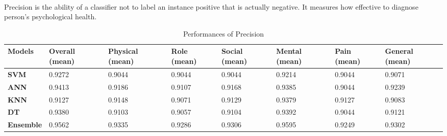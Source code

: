 \documentclass[runningheads]{llncs}
\begin{document}
\paragraph{}
Precision is the ability of a classifier not to label an instance positive that is actually negative. It measures how effective to diagnose person's psychological health.
\begin{table}[h]
\begin{tabular}{|C{2cm}|C{1.5cm}|C{1.5cm}|C{1.5cm}|C{1.5cm}|C{1.5cm}|C{1.5cm}|C{1.5cm}|}
\hline
{} 
{\color[HTML]{333333} \textbf{Models}} & {\color[HTML]{333333} \textbf{Overall (mean)}} & {\color[HTML]{333333} \textbf{Physical (mean)}} & {\color[HTML]{333333} \textbf{Role (mean)}} &{\color[HTML]{333333} \textbf{Social (mean)}} & {\color[HTML]{333333} \textbf{Mental (mean)}} & {\color[HTML]{333333} \textbf{Pain (mean)}} & {\color[HTML]{333333} \textbf{General (mean)}} \\ \hline
{} 
\textbf{SVM} & 0.9272 & 0.9044 & 0.9044  & 0.9044  & 0.9214  & 0.9044  & 0.9071  \\ \hline
{} 
\textbf{ANN}   & 0.9413   & 0.9186   & 0.9107  & 0.9168   & 0.9385 & 0.9044 & 0.9239 \\ \hline
{} 
\textbf{KNN} & 0.9127 & 0.9148 & 0.9071  & 0.9129 & 0.9379 & 0.9127  & 0.9083  \\ \hline
{} 
\textbf{DT} & 0.9380  & 0.9103  & 0.9057  & 0.9104  & 0.9392 & 0.9044  & 0.9121   \\ \hline
{} 
\textbf{Ensemble} & 0.9562  & 0.9335  & 0.9286 & 0.9306  & 0.9595  & 0.9249 & 0.9302 \\ \hline
\end{tabular}
\caption{Performances of Precision}
\label{Precision}
\end{table}
%
%
\end{document}
